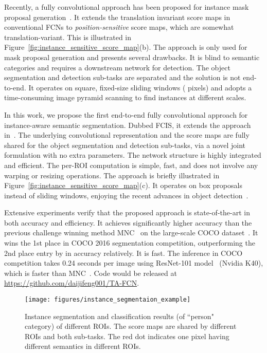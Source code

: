 \documentclass[10pt,twocolumn,letterpaper]{article}
\begin{document}
Recently, a fully convolutional approach has been proposed for instance mask proposal generation~\cite{dai2016instance}. It extends the translation invariant score maps in conventional FCNs to \emph{position-sensitive} score maps, which are somewhat translation-variant. This is illustrated in Figure~\ref{fig:instance_sensitive_score_map}(b). The approach is only used for mask proposal generation and presents several drawbacks. It is blind to semantic categories and requires a downstream network for detection. The object segmentation and detection sub-tasks are separated and the solution is not end-to-end. It operates on square, fixed-size sliding windows ( pixels) and adopts a time-consuming image pyramid scanning to find instances at different scales.

In this work, we propose the first end-to-end fully convolutional approach for instance-aware semantic segmentation. Dubbed FCIS, it extends the approach in~\cite{dai2016instance}. The underlying convolutional representation and the score maps are fully shared for the object segmentation and detection sub-tasks, via a novel joint formulation with no extra parameters. The network structure is highly integrated and efficient. The per-ROI computation is simple, fast, and does not involve any warping or resizing operations. The approach is briefly illustrated in Figure~\ref{fig:instance_sensitive_score_map}(c). It operates on box proposals instead of sliding windows, enjoying the recent advances in object detection~\cite{ren2015faster}.

Extensive experiments verify that the proposed approach is state-of-the-art in both accuracy and efficiency. It achieves significantly higher accuracy than the previous challenge winning method MNC~\cite{dai2016mnc} on the large-scale COCO dataset~\cite{lin2014coco}. It wins the 1st place in COCO 2016 segmentation competition, outperforming the 2nd place entry by  in accuracy relatively. It is fast. The inference in COCO competition takes 0.24 seconds per image using ResNet-101 model~\cite{he2016deep} (Nvidia K40), which is  faster than MNC~\cite{dai2016mnc}. Code would be released at \url{https://github.com/daijifeng001/TA-FCN}.

\begin{figure*}
	\centering
	\texttt{[image: figures/instance\_segmentaion\_example]}
	\caption{Instance segmentation and classification results (of ``person" category) of different ROIs. The score maps are shared by different ROIs and both sub-tasks. The red dot indicates one pixel having different semantics in different ROIs.}
	\label{fig:instance_segmentaion_example}
\end{figure*}
\end{document}
